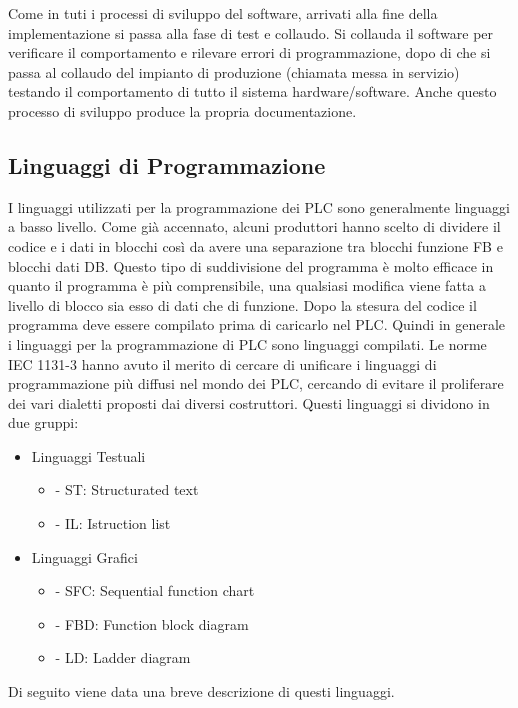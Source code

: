 \documentclass[12pt, a4paper, oneside]{book}
\begin{document}
Come in tuti i processi di sviluppo del software,  arrivati alla fine della implementazione si passa alla fase di test e collaudo. Si collauda il software per verificare il comportamento e rilevare errori di programmazione, dopo di che si passa al collaudo del impianto di produzione (chiamata messa in servizio) testando il comportamento di tutto il sistema hardware/software. Anche questo processo di sviluppo produce la propria documentazione.

\subsection{Linguaggi di Programmazione}
I linguaggi utilizzati per la programmazione dei PLC sono generalmente linguaggi a basso livello. Come già accennato, alcuni produttori hanno scelto di dividere il codice e i dati in blocchi così da avere una separazione tra blocchi funzione FB e blocchi dati DB. Questo tipo di suddivisione del programma è molto efficace in quanto il programma è più comprensibile, una qualsiasi modifica viene fatta a livello di blocco sia esso di dati che di funzione. Dopo la stesura del codice il programma deve essere compilato prima di caricarlo nel PLC. Quindi in generale i linguaggi per la programmazione di PLC sono linguaggi compilati. Le norme IEC 1131-3 hanno avuto il merito di cercare di unificare i linguaggi di programmazione più diffusi nel mondo dei PLC, cercando di evitare il proliferare dei vari dialetti proposti dai diversi costruttori.
Questi linguaggi si dividono in due gruppi:

\begin{itemize}
	\item  Linguaggi Testuali 
		\begin{itemize}
			\item - ST: Structurated text
			\item - IL: Istruction list
		\end{itemize}
	\item Linguaggi Grafici
		\begin{itemize}
			\item - SFC: Sequential function chart
			\item - FBD: Function block diagram
			\item - LD: Ladder diagram
		\end{itemize}
\end{itemize}

Di seguito viene data una breve descrizione di questi linguaggi.
\end{document}
